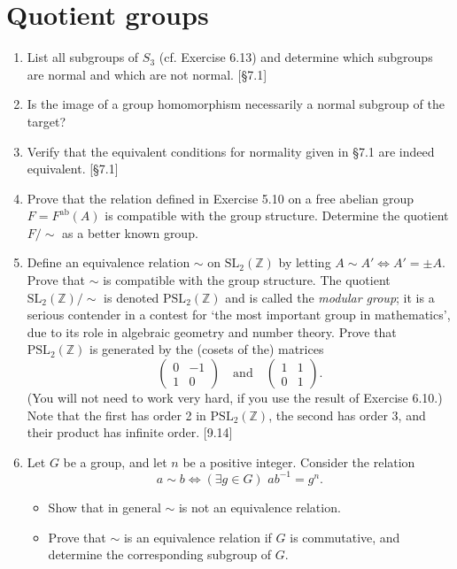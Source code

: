 \section{Quotient groups}
\begin{enumerate}
    \item List all subgroups of $S_3$ (cf. Exercise 6.13) and determine which subgroups are normal and which are not normal. [\S7.1]

    \item Is the image of a group homomorphism necessarily a normal subgroup of the target?

    \item Verify that the equivalent conditions for normality given in \S7.1 are indeed equivalent. [\S7.1]

    \item Prove that the relation defined in Exercise 5.10 on a free abelian group $F = F^{\text{ab}}(A)$ is compatible with the group structure. Determine the quotient $F/\sim$ as a better known group.

    \item Define an equivalence relation $\sim$ on $\text{SL}_2(\mathbb{Z})$ by letting $A \sim A' \iff A' = \pm A$. Prove that $\sim$ is compatible with the group structure. The quotient $\text{SL}_2(\mathbb{Z})/\sim$ is denoted $\text{PSL}_2(\mathbb{Z})$ and is called the \textit{modular group}; it is a serious contender in a contest for `the most important group in mathematics', due to its role in algebraic geometry and number theory. Prove that $\text{PSL}_2(\mathbb{Z})$ is generated by the (cosets of the) matrices
          \[ \begin{pmatrix} 0 & -1 \\ 1 & 0 \end{pmatrix} \quad \text{and} \quad \begin{pmatrix} 1 & 1 \\ 0 & 1 \end{pmatrix}. \]
          (You will not need to work very hard, if you use the result of Exercise 6.10.) Note that the first has order 2 in $\text{PSL}_2(\mathbb{Z})$, the second has order 3, and their product has infinite order. [9.14]

    \item Let $G$ be a group, and let $n$ be a positive integer. Consider the relation
          \[ a \sim b \iff (\exists g \in G) \,\, ab^{-1} = g^n. \]
          \begin{itemize}
              \item Show that in general $\sim$ is not an equivalence relation.
              \item Prove that $\sim$ is an equivalence relation if $G$ is commutative, and determine the corresponding subgroup of $G$.
          \end{itemize}


\end{enumerate}
